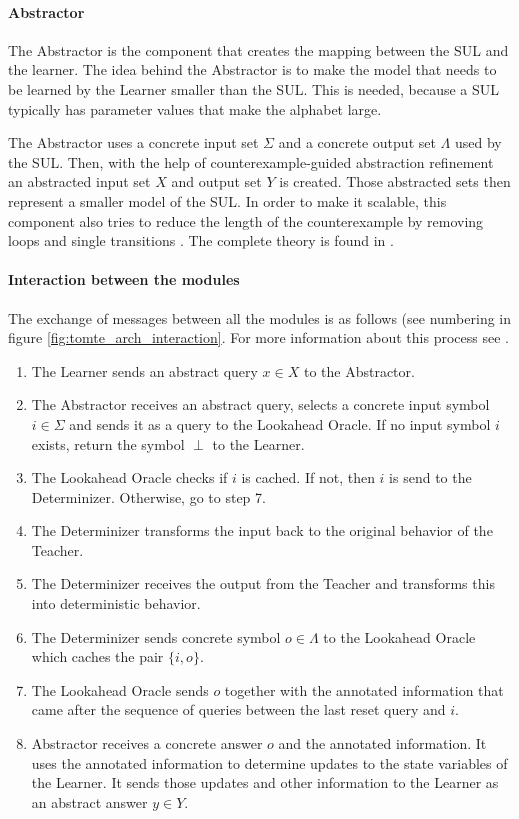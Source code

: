 \documentclass[multi,crop=false,class=article]{standalone}
\begin{document}
\paragraph{Abstractor} The Abstractor is the component that creates the mapping
between the SUL and the learner. The idea behind the Abstractor is to make the
model that needs to be learned by the Learner smaller than the SUL. This is
needed, because a SUL typically has parameter values that make the alphabet
large.

The Abstractor uses a concrete input set $\Sigma$ and a concrete
output set $\Lambda$ used by the SUL. Then, with the help of
counterexample-guided abstraction refinement\cite[p. 104]{Tomte2014} an
abstracted input set $X$ and output set $Y$ is created. Those abstracted sets
then represent a smaller model of the SUL. In order to make it scalable, this
component also tries to reduce the length of the counterexample by removing
loops and single transitions \cite{Koopman2014}. The complete theory is found
in \cite{Tomte2014}.

\paragraph{Interaction between the modules} The exchange of messages between
all the modules is as follows (see numbering in figure
\ref{fig:tomte_arch_interaction}. For more information about this process see
\cite{Aarts2015,Tomte2014}.

\begin{enumerate}
	\item The Learner sends an abstract query $x \in X$ to the Abstractor.
	\item The Abstractor receives an abstract query, selects a concrete input
	symbol $i \in \Sigma$ and sends it as a query to the Lookahead
	Oracle. If no input symbol $i$ exists, return the symbol $\perp$ to the
	Learner.
	\item The Lookahead Oracle checks if $i$ is cached. If not, then $i$ is send
	to the Determinizer. Otherwise, go to step 7.
	\item The Determinizer transforms the input back to the original behavior of
	the Teacher.
	\item The Determinizer receives the output from the Teacher and transforms
	this into deterministic behavior.
	\item The Determinizer sends concrete symbol $o \in \Lambda$ to the
	Lookahead Oracle which caches the pair $\{i,o\}$.
	\item The Lookahead Oracle sends $o$ together with the annotated information
	that came after the sequence of queries between the last reset query and
	$i$.
	\item Abstractor receives a concrete answer $o$ and the annotated
	information. It uses the annotated information to determine updates to the
	state variables of the Learner. It sends those updates and other
	information to the Learner as an abstract answer $y \in Y$.
\end{enumerate}
\end{document}
